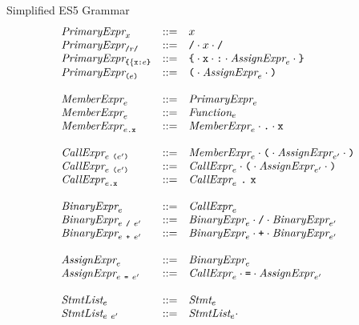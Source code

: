 \documentclass[preprint,10pt]{sigplanconf}
\begin{document}
\begin{displayfigure*}{\label{fig:grammar}Simplified ES5 Grammar}
\[
\begin{array}{lcl}
  \textit{PrimaryExpr}_{x} &::=& x
  \\
  \textit{PrimaryExpr}_{\texttt{/}r\texttt{/}} &::=& \texttt{/} \cdot x \cdot \texttt{/}
  \\
  \textit{PrimaryExpr}_{
    \texttt{\{} \{\texttt{x} \texttt{:} e \texttt{\}}
  } 
  &::=& 
  \texttt{\{} \cdot \texttt{x} \cdot \texttt{:} \cdot  \textit{AssignExpr}_{e}
    \cdot \texttt{\}}
  \\
  \textit{PrimaryExpr}_{\texttt{(} e \texttt{)}} &::=& 
  \texttt{(} \cdot \textit{AssignExpr}_{e} \cdot \texttt{)}
  \\ \\
  \textit{MemberExpr}_{e} &::=&
  \textit{PrimaryExpr}_{e}
  \\
  \textit{MemberExpr}_{e} &::=&
  \textit{Function}_{e}
  \\
  \textit{MemberExpr}_{e\texttt{.\texttt{x}}} &::=&
  \textit{MemberExpr}_{e} \cdot \texttt{.} \cdot \texttt{x}
  \\ \\
  \textit{CallExpr}_{e~ \texttt{(}e' \texttt{)}} &::=& 
  \textit{MemberExpr}_{e} \cdot
  \texttt{(}\cdot \textit{AssignExpr}_{e'} \cdot \texttt{)}
  \\
  \textit{CallExpr}_{e~ \texttt{(}e' \texttt{)}} &::=& 
  \textit{CallExpr}_{e} \cdot
  \texttt{(}\cdot \textit{AssignExpr}_{e'} \cdot \texttt{)}
  \\
  \textit{CallExpr}_{e\texttt{.\texttt{x}}} &::=& 
  \textit{CallExpr}_{e}~\texttt{.}~
  \texttt{x}
  \\ \\
  \textit{BinaryExpr}_{e} &::=& \textit{CallExpr}_{e} \\
  \textit{BinaryExpr}_{e ~\texttt{/}~ e'}
  &::=&
  \textit{BinaryExpr}_{e} \cdot \texttt{/} \cdot  \textit{BinaryExpr}_{e'} \\
  \textit{BinaryExpr}_{e ~\texttt{+}~ e'}
  &::=&
  \textit{BinaryExpr}_{e} \cdot \texttt{+} \cdot \textit{BinaryExpr}_{e'}
  \\ \\
  \textit{AssignExpr}_{e} &::=&
  \textit{BinaryExpr}_{e}
  \\
  \textit{AssignExpr}_{e~\texttt{=}~e'} &::=&
  \textit{CallExpr}_{e} \cdot \texttt{=} \cdot
  \textit{AssignExpr}_{e'}
  \\ \\
  \textit{StmtList}_{e} &::=&
  \textit{Stmt}_{e}
  \\
  \textit{StmtList}_{e~e'} &::=&
  \textit{StmtList}_{e} \cdot

\end{array}\]
\end{displayfigure*}
\end{document}
